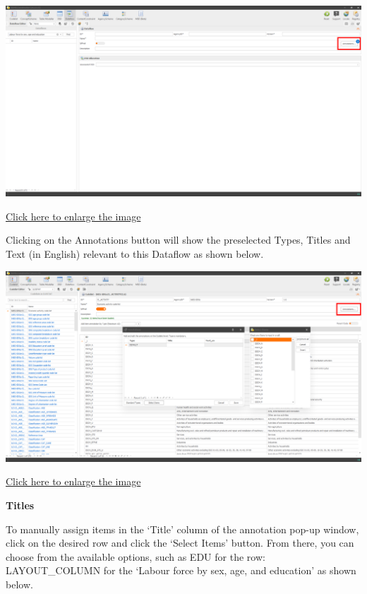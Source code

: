 \documentclass[
]{book}
\begin{document}
\begin{center}\includegraphics[width=1\linewidth]{./images/image5} \end{center}

\href{images/image5.png}{Click here to enlarge the image}

Clicking on the Annotations button will show the preselected Types, Titles and Text (in English) relevant to this Dataflow as shown below.

\begin{center}\includegraphics[width=1\linewidth]{./images/image6} \end{center}

\href{images/image6.png}{Click here to enlarge the image}

\textbf{Titles}

To manually assign items in the `Title' column of the annotation pop-up window, click on the desired row and click the `Select Items' button. From there, you can choose from the available options, such as EDU for the row: LAYOUT\_COLUMN for the `Labour force by sex, age, and education' as shown below.
\end{document}
